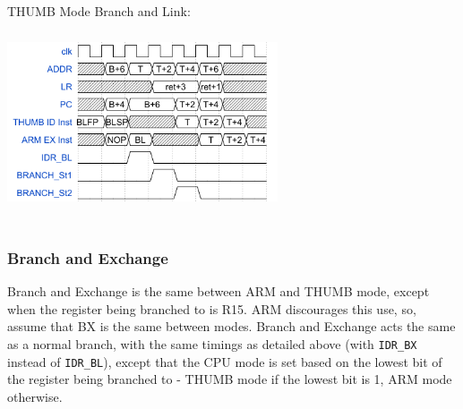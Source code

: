 \documentclass[11pt,a4paper]{article}
\begin{document}
	THUMB Mode Branch and Link:\\
	\includegraphics[height=6cm, width=8cm, keepaspectratio=true]{thumbbl}
	
	\subsubsection{Branch and Exchange}
	Branch and Exchange is the same between ARM and THUMB mode, except when the register being branched to is R15. ARM discourages this use, so, assume that BX is the same between modes. Branch and Exchange acts the same as a normal branch, with the same timings as detailed above (with \texttt{IDR\_BX} instead of \texttt{IDR\_BL}), except that the CPU mode is set based on the lowest bit of the register being branched to - THUMB mode if the lowest bit is 1, ARM mode otherwise.
	
\end{document}
